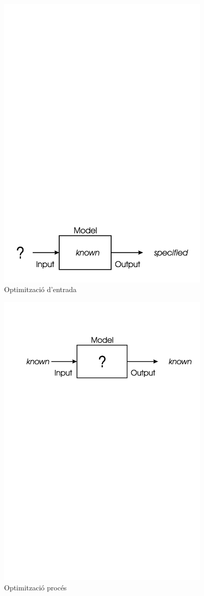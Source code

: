\begin{figure} \centering \includegraphics[width=4in]{intro/1-4.jpg}
\caption{\label{fig:ch1-4}Optimització d'entrada}
\end{figure}
\begin{figure} \centering \includegraphics[width=4in]{intro/1-5.jpg}
\caption{\label{fig:ch1-5}Optimització procés}
\end{figure}

